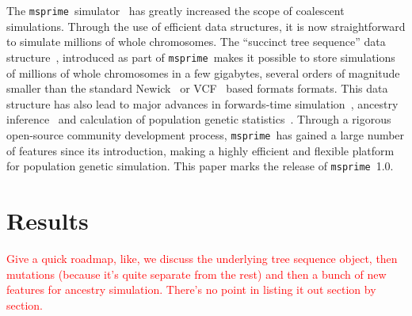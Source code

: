 \documentclass{article}
\newcommand{\msprime}[0]{\texttt{msprime}}
\newcommand{\jkcomment}[1]{\textcolor{red}{#1}}
\begin{document}
The \msprime\ simulator~\citep{kelleher2016efficient,kelleher2020coalescent}
has greatly increased the scope of coalescent simulations.
Through the use of efficient data structures, it is
now straightforward to simulate millions of whole chromosomes.
The ``succinct tree sequence'' data
structure~\citep{kelleher2016efficient,kelleher2018efficient,kelleher2019inferring,
wohns2021unified},
introduced as part of \msprime\, makes it possible to store simulations
of millions of whole chromosomes in a few gigabytes, several orders
of magnitude smaller than the standard
Newick~\citep{felsenstein1989phylip} or
VCF~\citep{danecek2011variant} based formats formats.
This data structure has
also lead to major advances in forwards-time
simulation~\citep{kelleher2018efficient,haller2018tree},
ancestry inference~\citep{kelleher2019inferring,wohns2021unified}
and calculation of population genetic statistics~\citep{ralph2020efficiently}.
Through a rigorous open-source community development process,
\msprime\ has gained a large number of features since its introduction,
making a highly efficient and flexible platform for population
genetic simulation.
This paper marks the release of \msprime\ 1.0.

%

\section*{Results}

\jkcomment{Give a quick roadmap,
like, we discuss the underlying tree sequence object,
then mutations (because it's quite separate from the rest)
and then a bunch of new features for ancestry simulation. There's no
point in listing it out section by section.}

\end{document}
